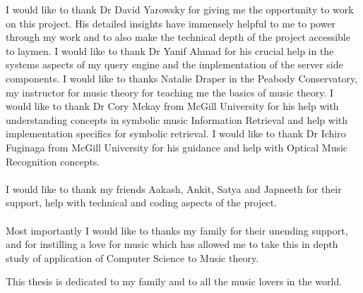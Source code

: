 \begin{frontmatter}
\begin{acknowledgment}
\noindent I would like to thank Dr David Yarowsky for giving me the opportunity to work on this project. His detailed insights have immensely helpful to me to power through my work and to also make the technical depth of the project accessible to laymen. I would like to thank Dr Yanif Ahmad for his crucial help in the systems aspects of my query engine and the implementation of the server side components. I would like to thanks Natalie Draper in the Peabody Conservatory, my instructor for music theory for teaching me the basics of music theory. I would like to thank Dr Cory Mckay from McGill University for his help with understanding concepts in symbolic music Information Retrieval and help with implementation specifics for symbolic retrieval. I would like to thank Dr Ichiro Fuginaga from McGill University for his guidance and help with Optical Music Recognition concepts. \\\\
I would like to thank my friends Aakash, Ankit, Satya and Japneeth for their support, help with technical and coding aspects of the project. \\\\
Most importantly I would like to thanks my family for their unending support, and for instilling a love for music which has allowed me to take this in depth study of application of Computer Science to Music theory.

\end{acknowledgment}

\begin{dedication}
 
This thesis is dedicated to my family and to all the music lovers in the world. 

\end{dedication}

\tableofcontents

\end{frontmatter}
